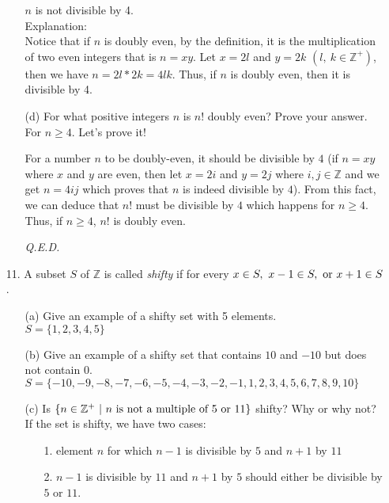 \documentclass[12pt, a4paper]{article}                  %
\begin{document}
\begin{enumerate}
\begin{enumerate}
$n$ is not divisible by 4.\\

Explanation:\\
Notice that if $n$ is doubly even, by the definition, it is the multiplication
of two even integers that is $n = xy$. Let $x = 2l$ and $y = 2k$ $(l, \ k \in \mathbb{Z}^+)$, then we have
$n = 2l * 2k = 4lk$. Thus, if $n$ is doubly even, then it is divisible by 4.
\\
\item[(d)]
For what positive integers $n$ is $n!$ doubly even? Prove your answer.\\

For $n \geq 4$. Let's prove it!

For a number $n$ to be doubly-even, it should be divisible by $4$
(if $n = xy$ where $x$ and $y$ are even, then let $x = 2i$ and $y = 2j$
where $i,j \in \mathbb{Z}$ and we get $n = 4ij$ which proves that $n$ is
indeed divisible by $4$). From this fact, we can deduce that $n!$ must
be divisible by $4$ which happens for $n \geq 4$. Thus, if $n \geq 4$, $n!$
is doubly even.
\begin{flushright}
\textit{Q.E.D.}
\end{flushright}
\end{enumerate}

\item[11.]
A subset $S$ of $\mathbb{Z}$ is called \textit{shifty} if for every $x \in S, \ x - 1 \in S, \ \textnormal{or} \ x + 1 \in S$.
\begin{enumerate}
\item[(a)]
Give an example of a shifty set with 5 elements.\\

$S = \{1,2,3,4,5\}$
\\
\item[(b)]
Give an example of a shifty set that contains $10$ and $-10$ but does not contain $0$.\\

$S = \{-10,-9,-8,-7,-6,-5,-4,-3,-2,-1,1,2,3,4,5,6,7,8,9,10\}$
\\
\item[(c)]
Is $\{n \in \mathbb{Z}^+ \ \vert \ n \ \textnormal{is not a multiple of 5 or 11} \}$ shifty? Why or why not?\\

If the set is shifty, we have two cases:
\begin{enumerate}
\item[1.]
element $n$ for which $n-1$ is divisible by $5$ and $n + 1$ by $11$
\item[2.]
$n-1$ is divisible by $11$ and $n + 1$ by $5$ should either be divisible by $5$ or $11$.
\end{enumerate}


\end{enumerate}
\end{enumerate}
\end{document}
